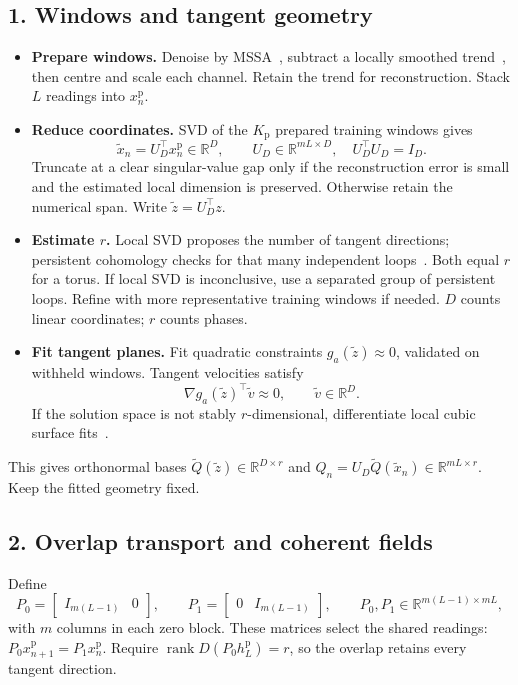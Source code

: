 \documentclass[11pt,a4paper]{article}
\newcommand{\R}{\mathbb R}
\begin{document}
\subsection*{1. Windows and tangent geometry}
\begin{itemize}
\setlength{\itemsep}{2pt}
\item \textbf{Prepare windows.}
Denoise by MSSA~\citep{GrothGhil2011}, subtract a locally smoothed
trend~\citep{SavitzkyGolay1964}, then centre and scale each channel.
Retain the trend for reconstruction. Stack $L$ readings into $x_n^{\mathrm p}$.
\item \textbf{Reduce coordinates.}
SVD of the $K_{\mathrm p}$ prepared training windows gives
\[
\widetilde x_n=U_D^\top x_n^{\mathrm p}\in\R^D,
\qquad U_D\in\R^{mL\times D},\quad U_D^\top U_D=I_D.
\]
Truncate at a clear singular-value gap only if the reconstruction error
is small and the estimated local dimension is preserved.
Otherwise retain the numerical span. Write $\widetilde z=U_D^\top z$.
\item \textbf{Estimate $r$.}
Local SVD proposes the number of tangent directions; persistent cohomology
checks for that many independent loops~\citep{deSilva2011}.
Both equal $r$ for a torus. If local SVD is inconclusive, use a separated
group of persistent loops. Refine with more representative training windows
if needed. $D$ counts linear coordinates; $r$ counts phases.
\item \textbf{Fit tangent planes.}
Fit quadratic constraints $g_a(\widetilde z)\approx0$, validated on withheld
windows. Tangent velocities satisfy
\[
\nabla g_a(\widetilde z)^\top\widetilde v\approx0,
\qquad \widetilde v\in\R^D.
\]
If the solution space is not stably $r$-dimensional, differentiate local
cubic surface fits~\citep{Levin2004,AamariLevrard2019}.
\end{itemize}
This gives orthonormal bases $\widetilde Q(\widetilde z)\in\R^{D\times r}$
and $Q_n=U_D\widetilde Q(\widetilde x_n)\in\R^{mL\times r}$.
Keep the fitted geometry fixed.

\subsection*{2. Overlap transport and coherent fields}
Define
\[
P_0=\begin{bmatrix}I_{m(L-1)}&0\end{bmatrix},\qquad
P_1=\begin{bmatrix}0&I_{m(L-1)}\end{bmatrix},\qquad
P_0,P_1\in\R^{m(L-1)\times mL},
\]
with $m$ columns in each zero block. These matrices select the shared
readings: $P_0x_{n+1}^{\mathrm p}=P_1x_n^{\mathrm p}$.
Require $\operatorname{rank}D(P_0h_L^{\mathrm p})=r$, so the overlap retains
every tangent direction.
\end{document}
